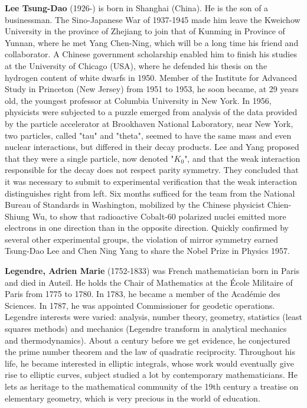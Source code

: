 \textbf{Lee Tsung-Dao} (1926-) is born in Shanghai (China). He is the son of a businessman. The Sino-Japanese War of 1937-1945 made him leave the Kweichow University in the province of Zhejiang to join that of Kunming in Province of Yunnan, where he met Yang Chen-Ning, which will be a long time his friend and collaborator. A Chinese government scholarship enabled him to finish his studies at the University of Chicago (USA), where he defended his thesis on the hydrogen content of white dwarfs in 1950. Member of the Institute for Advanced Study in Princeton (New Jersey) from 1951 to 1953, he soon became, at 29 years old, the youngest professor at Columbia University in New York. In 1956, physicists were subjected to a puzzle emerged from analysis of the data provided by the particle accelerator at Brookhaven National Laboratory, near New York, two particles, called "tau" and "theta", seemed to have the same mass and even nuclear interactions, but differed in their decay products. Lee and Yang proposed that they were a single particle, now denoted "$K_0$", and that the weak interaction responsible for the decay does not respect parity symmetry. They concluded that it was necessary to submit to experimental verification that the weak interaction distinguishes right from left. Six months sufficed for the team from the National Bureau of Standards in Washington, mobilized by the Chinese physicist Chien-Shiung Wu, to show that radioactive Cobalt-60 polarized nuclei emitted more electrons in one direction than in the opposite direction. Quickly confirmed by several other experimental groups, the violation of mirror symmetry earned Tsung-Dao Lee and Chen Ning Yang to share the Nobel Prize in Physics 1957.

\textbf{Legendre, Adrien Marie} (1752-1833) was French mathematician born in Paris and died in Auteil. He holds the Chair of Mathematics at the École Militaire of Paris from 1775 to 1780. In 1783, he became a member of the Académie des Sciences. In 1787, he was appointed Commissioner for geodetic operations. Legendre interests were varied: analysis, number theory, geometry, statistics (least squares methods) and mechanics (Legendre transform in analytical mechanics and thermodynamics). About a century before we get evidence, he conjectured the prime number theorem and the law of quadratic reciprocity. Throughout his life, he became interested in elliptic integrals, whose work would eventually give rise to elliptic curves, subject studied a lot by contemporary mathematicians. He lets as heritage to the mathematical community of the 19th century a treatise on elementary geometry, which is very precious in the world of education.


